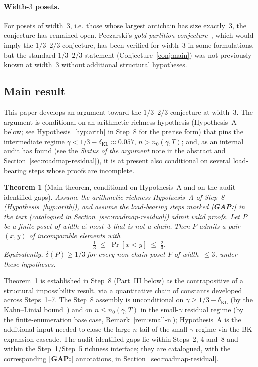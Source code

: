 \documentclass[11pt]{article}
\newtheorem{theorem}{Theorem}[section]
\theoremstyle{definition}
\theoremstyle{remark}
\begin{document}
\paragraph{Width-$3$ posets.}
For posets of width~$3$, i.e.\ those whose largest antichain has size
exactly~$3$, the conjecture has remained open.  Peczarski's
\emph{gold partition conjecture}~\cite{Peczarski2008}, which would
imply the $1/3$--$2/3$ conjecture, has been verified for width~$3$ in
some formulations, but the standard $1/3$--$2/3$ statement
(Conjecture~\ref{conj:main}) was not previously known at width~$3$
without additional structural hypotheses.

\subsection{Main result}

This paper develops an argument toward the $1/3$--$2/3$ conjecture at
width~$3$. The argument is conditional on an arithmetic richness
hypothesis (Hypothesis~A below; see Hypothesis~\ref{hyp:arith} in
Step~8 for the precise form) that pins the intermediate regime
$\gamma < 1/3 - \delta_{\mathrm{KL}} \approx 0.057$,
$n > n_0(\gamma, T)$; and, as an internal audit has found (see the
\emph{Status of the argument} note in the abstract and
Section~\ref{sec:roadmap-residual}), it is at present also conditional
on several load-bearing steps whose proofs are incomplete.

\begin{theorem}[Main theorem, conditional on Hypothesis~A and on the
audit-identified gaps]
\label{thm:main}
Assume the arithmetic richness Hypothesis~A of Step~8
(Hypothesis~\ref{hyp:arith}), and assume the load-bearing steps marked
\textbf{[GAP:]} in the text (catalogued in
Section~\ref{sec:roadmap-residual}) admit valid proofs. Let $P$ be a
finite poset of width at most~$3$ that is not a chain. Then $P$ admits
a pair $(x,y)$ of incomparable elements with
\[
  \tfrac{1}{3} \;\le\; \Pr[x<y] \;\le\; \tfrac{2}{3}.
\]
Equivalently, $\delta(P)\ge 1/3$ for every non-chain poset $P$ of
width~$\le 3$, under these hypotheses.
\end{theorem}

Theorem~\ref{thm:main} is established in Step~8 (Part~III below) as
the contrapositive of a structural impossibility result, via a
quantitative chain of constants developed across Steps~1--7. The
Step~8 assembly is unconditional on $\gamma \ge 1/3 -
\delta_{\mathrm{KL}}$ (by the Kahn--Linial
bound~\cite{KahnLinial1991}) and on $n \le n_0(\gamma, T)$ in the
small-$\gamma$ residual regime (by the finite-enumeration base
case, Remark~\ref{rem:small-n}); Hypothesis~A is the additional
input needed to close the large-$n$ tail of the small-$\gamma$
regime via the BK-expansion cascade. The audit-identified gaps lie
within Steps~2, 4 and~8 and within the Step~1/Step~5 richness
interface; they are catalogued, with the corresponding
\textbf{[GAP:]} annotations, in Section~\ref{sec:roadmap-residual}.
\end{document}
